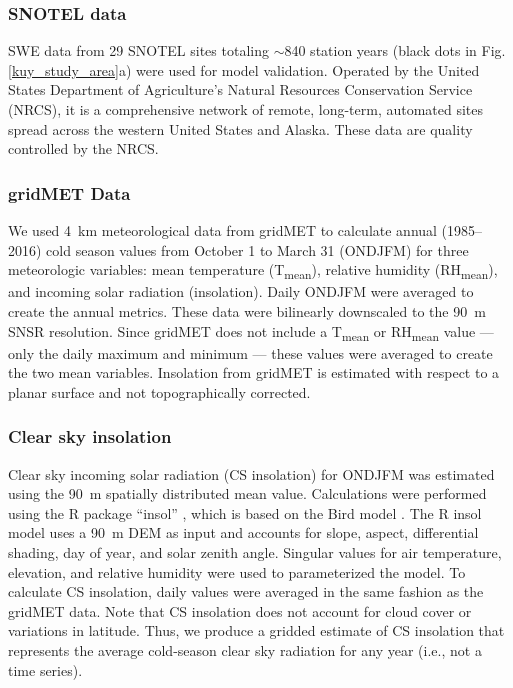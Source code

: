\hypertarget{ch2-do-2}{\subsubsection{SNOTEL data}\label{ch2-do-2}}

SWE data from 29 SNOTEL sites totaling $\sim$840 station years (black dots in Fig. \ref{kuy_study_area}a) were used for model validation. Operated by the United States Department of Agriculture's Natural Resources Conservation Service (NRCS), it is a comprehensive network of remote, long-term, automated sites spread across the western United States and Alaska. These data are quality controlled by the NRCS.

\hypertarget{ch2-do-2}{\subsubsection{gridMET Data}\label{ch2-do-2}}

We used 4~km meteorological data from gridMET \citep{abatzoglouDevelopmentGriddedSurface2013} to calculate annual (1985--2016) cold season values from October 1 to March 31 (ONDJFM) for three meteorologic variables: mean temperature (T\textsubscript{mean}), relative humidity (RH\textsubscript{mean}), and incoming solar radiation (insolation). Daily ONDJFM were averaged to create the annual metrics. These data were bilinearly downscaled to the 90~m SNSR resolution. Since gridMET does not include a T\textsubscript{mean} or RH\textsubscript{mean} value --- only the daily maximum and minimum --- these values were averaged to create the two mean variables. Insolation from gridMET is estimated with respect to a planar surface and not topographically corrected. 

\hypertarget{ch2-do-2}{\subsubsection{Clear sky insolation}\label{ch2-do-2}}

Clear sky incoming solar radiation (CS insolation) for ONDJFM was estimated using the 90~m spatially distributed mean value. Calculations were performed using the R package ``insol” \citep{corripioInsolSolarRadiation2020}, which is based on the Bird model \citep{birdReviewEvaluationImprovement1981}. The R insol model uses a 90~m DEM as input and accounts for slope, aspect, differential shading, day of year, and solar zenith angle. 
Singular values for air temperature, elevation, and relative humidity were used to parameterized the model. To calculate CS insolation, daily values were averaged in the same fashion as the gridMET data. Note that CS insolation does not account for cloud cover or variations in latitude. Thus, we produce a gridded estimate of CS insolation that represents the average cold-season clear sky radiation for any year (i.e., not a time series).


